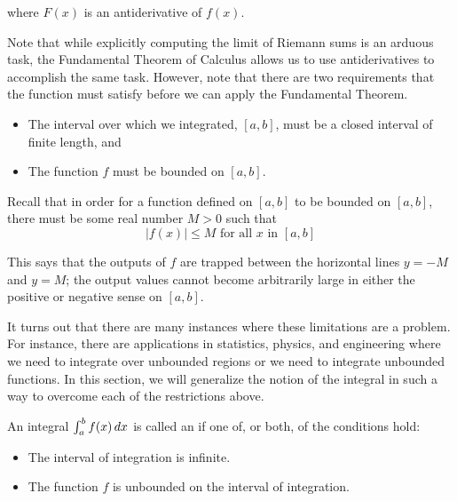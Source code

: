 \documentclass{ximera}
\begin{document}
where $F(x)$ is an antiderivative of $f(x)$.

Note that while explicitly computing the limit of Riemann sums is an arduous task, the Fundamental Theorem of Calculus allows us to use antiderivatives to accomplish the same task.  However, note that there are two requirements that the function must satisfy before we can apply the Fundamental Theorem.

\begin{itemize}
\item The interval over which we integrated, $[a,b]$, must be a closed interval of finite length, and
\item The function $f$ must be bounded on $[a,b]$.
\end{itemize}


\begin{remark}
Recall that in order for a function defined on $[a, b]$ to be bounded on $[a,b]$, there must be some real number $M>0$ such that 
\[
|f(x)| \leq M \text{ for all } x \text{ in } [a, b]
\]

This says that the outputs of $f$ are trapped between the horizontal lines $y=-M$ and $y=M$; the output values cannot 
become arbitrarily large in either the positive or negative sense on $[a,b]$. 
\end{remark}


It turns out that there are many instances where these limitations are a problem.  For instance, there are applications in statistics, physics, and engineering where we need to integrate over unbounded regions or we need to integrate unbounded functions.  In this section, we will generalize the notion of the integral in such a way to overcome each of the restrictions above.



\begin{definition}
  An integral $\int_a^b f(x) \mathop{}\!d x $
  is called an  if one of, or both, of the conditions hold:
  \begin{itemize}
  \item The interval of integration is infinite.
  \item The function $f$ is unbounded on the interval of integration.
  \end{itemize}
\end{definition}
\end{document}
